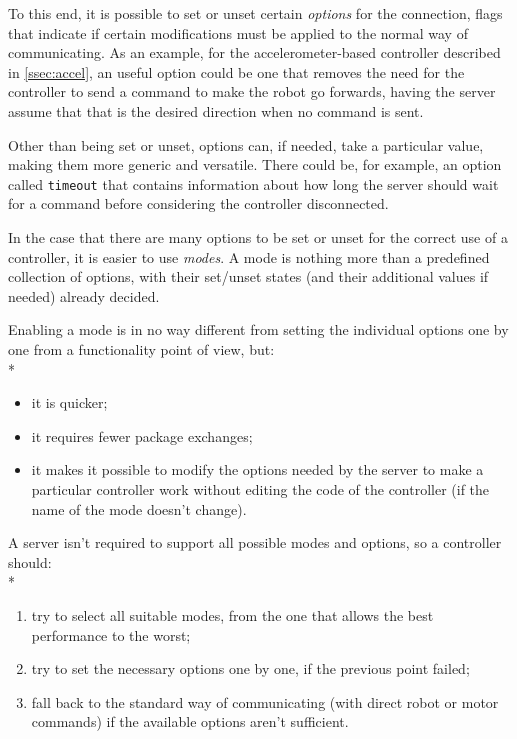   To this end, it is possible to set or unset certain
  \textit{options} for the connection, flags that indicate if
  certain modifications must be applied to the normal way of
  communicating. As an example, for the accelerometer-based
  controller described in \autoref{ssec:accel}, an useful option could
  be one that removes the need for the controller to send a command
  to make the robot go forwards, having the server assume that that
  is the desired direction when no command is sent.

  Other than being set or unset, options can, if needed, take a
  particular value, making them more generic and versatile. There
  could be, for example, an option called \texttt{timeout} that
  contains information about how long the server should wait for a
  command before considering the controller disconnected.

  In the case that there are many options to be set or unset for the
  correct use of a controller, it is easier to use \textit{modes}. A
  mode is nothing more than a predefined collection of options, with
  their set/unset states (and their additional values if needed)
  already decided.

  \beforelist* Enabling a mode is in no way different from setting the individual
  options one by one from a functionality point of view, but:\\*
  \begin{itemize}
  \item it is quicker;
  \item it requires fewer package exchanges;
  \item it makes it possible to modify the options needed by the
    server to make a particular controller work without editing the
    code of the controller (if the name of the mode doesn't change).
  \end{itemize}
  \afterlist*
  \beforelist* A server isn't required to support all possible modes and options,
  so a controller should:\\*
  \begin{enumerate}
  \item try to select all suitable modes, from the one that allows
    the best performance to the worst;
  \item try to set the necessary options one by one, if the previous
    point failed;
  \item fall back to the standard way of communicating (with direct
    robot or motor commands) if the available options aren't
    sufficient.
  \end{enumerate}
  \afterlist*

